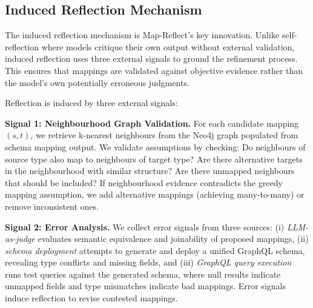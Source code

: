 \documentclass[sigconf, nonacm]{acmart}
\newcommand{\deleted}[1]{\textcolor{red}{#1}}
\begin{document}
\subsection{Induced Reflection Mechanism}


The induced reflection mechanism is Map-Reflect's key innovation. Unlike self-reflection where models critique their own output without external validation, induced reflection uses three external signals to ground the refinement process. This ensures that mappings are validated against objective evidence rather than the model's own potentially erroneous judgments.


Reflection is induced by three external signals:

\textbf{Signal 1: Neighbourhood Graph Validation.} For each candidate mapping $(s, t)$, we retrieve k-nearest neighbours from the Neo4j graph populated from schema mapping output. We validate assumptions by checking: Do neighbours of source type also map to neighbours of target type? Are there alternative targets in the neighbourhood with similar structure? Are there unmapped neighbours that should be included? If neighbourhood evidence contradicts the greedy mapping assumption, we add alternative mappings (achieving many-to-many) or remove inconsistent ones.

\textbf{Signal 2: Error Analysis.} We collect error signals from three sources: (i) \emph{LLM-as-judge} evaluates semantic equivalence and joinability of proposed mappings, (ii) \emph{schema deployment} attempts to generate and deploy a unified GraphQL schema, revealing type conflicts and missing fields, and (iii) \emph{GraphQL query execution} runs test queries against the generated schema, where null results indicate unmapped fields and type mismatches indicate bad mappings. Error signals induce reflection to revise contested mappings.
\end{document}

